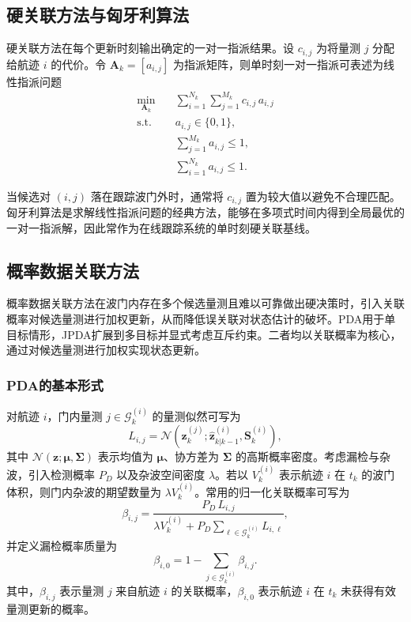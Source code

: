 \documentclass{xdupgthesis}
\begin{document}
\subsection{硬关联方法与匈牙利算法}

硬关联方法在每个更新时刻输出确定的一对一指派结果。设 $c_{i,j}$ 为将量测 $j$ 分配给航迹 $i$ 的代价。令 $\mathbf{A}_k=[a_{i,j}]$ 为指派矩阵，则单时刻一对一指派可表述为线性指派问题
\begin{align}
	\min_{\mathbf{A}_k}\quad 
	& \sum_{i=1}^{N_k}\sum_{j=1}^{M_k} c_{i,j}\,a_{i,j} \\
	\text{s.t.}\quad
	& a_{i,j}\in\{0,1\}, \\
	& \sum_{j=1}^{M_k} a_{i,j}\le 1, \\
	& \sum_{i=1}^{N_k} a_{i,j}\le 1 .
\end{align}

当候选对 $(i,j)$ 落在跟踪波门外时，通常将 $c_{i,j}$ 置为较大值以避免不合理匹配。匈牙利算法是求解线性指派问题的经典方法，能够在多项式时间内得到全局最优的一对一指派解，因此常作为在线跟踪系统的单时刻硬关联基线。

\subsection{概率数据关联方法}

概率数据关联方法在波门内存在多个候选量测且难以可靠做出硬决策时，引入关联概率对候选量测进行加权更新，从而降低误关联对状态估计的破坏。PDA用于单目标情形，JPDA扩展到多目标并显式考虑互斥约束。二者均以关联概率为核心，通过对候选量测进行加权实现状态更新。


\subsubsection{PDA的基本形式}

对航迹 $i$，门内量测 $j\in\mathcal{G}^{(i)}_k$ 的量测似然可写为
\begin{equation}
	L_{i,j}
	=
	\mathcal{N}\!\left(
	\mathbf{z}^{(j)}_k;
	\hat{\mathbf{z}}^{(i)}_{k|k-1},
	\mathbf{S}^{(i)}_k
	\right),
\end{equation}
其中 $\mathcal{N}(\mathbf{z};\boldsymbol{\mu},\mathbf{\Sigma})$ 表示均值为 $\boldsymbol{\mu}$、协方差为 $\mathbf{\Sigma}$ 的高斯概率密度。考虑漏检与杂波，引入检测概率 $P_D$ 以及杂波空间密度 $\lambda$。若以 $V_k^{(i)}$ 表示航迹 $i$ 在 $t_k$ 的波门体积，则门内杂波的期望数量为 $\lambda V_k^{(i)}$。常用的归一化关联概率可写为
\begin{equation}
	\beta_{i,j}
	=
	\frac{P_D\,L_{i,j}}
	{\lambda V_k^{(i)} + P_D\sum\limits_{\ell\in\mathcal{G}^{(i)}_k}L_{i,\ell}},
\end{equation}
并定义漏检概率质量为
\begin{equation}
	\beta_{i,0}
	=
	1-\sum_{j\in\mathcal{G}^{(i)}_k}\beta_{i,j}.
\end{equation}
其中，$\beta_{i,j}$ 表示量测 $j$ 来自航迹 $i$ 的关联概率，$\beta_{i,0}$ 表示航迹 $i$ 在 $t_k$ 未获得有效量测更新的概率。
\end{document}
